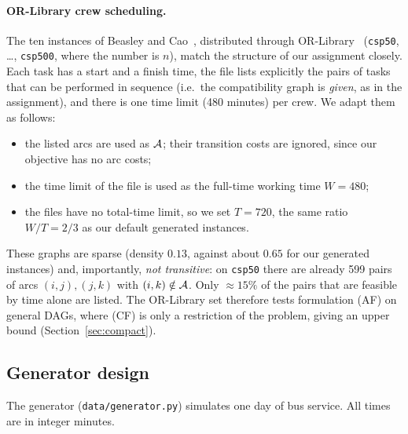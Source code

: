 \paragraph{OR-Library crew scheduling.} The ten instances of Beasley and
Cao~\cite{beasley1996}, distributed through OR-Library~\cite{beasley1990}
(\texttt{csp50}, \dots, \texttt{csp500}, where the number is $n$), match the
structure of our assignment closely. Each task has a start and a finish
time, the file lists explicitly the pairs of tasks that can be performed in
sequence (i.e.\ the compatibility graph is \emph{given}, as in the
assignment), and there is one time limit (480 minutes) per crew. We adapt them
as follows:
\begin{itemize}[nosep]
  \item the listed arcs are used as $\mathcal{A}$; their transition costs are
    ignored, since our objective has no arc costs;
  \item the time limit of the file is used as the full-time working time
    $W=480$;
  \item the files have no total-time limit, so we set $T=720$, the same ratio
    $W/T=2/3$ as our default generated instances.
\end{itemize}
These graphs are sparse (density $0.13$, against about $0.65$ for our
generated instances) and, importantly, \emph{not transitive}: on
\texttt{csp50} there are already 599 pairs of arcs $(i,j),(j,k)$ with
$(i,k)\notin\mathcal{A}$. Only $\approx 15\%$ of the pairs that are feasible by time
alone are listed. The OR-Library set therefore tests formulation (AF) on
general DAGs, where (CF) is only a restriction of the problem, giving an
upper bound (Section~\ref{sec:compact}).

\subsection{Generator design}
\label{sec:generator}

The generator (\texttt{data/generator.py}) simulates one day of bus service.
All times are in integer minutes.

